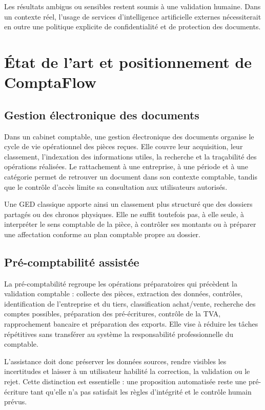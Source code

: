 \documentclass[12pt,a4paper,oneside]{report}
\begin{document}
Les résultats ambigus ou sensibles restent soumis à une validation humaine.
Dans un contexte réel, l'usage de services d'intelligence artificielle externes
nécessiterait en outre une politique explicite de confidentialité et de
protection des documents.

\chapter{État de l'art et positionnement de ComptaFlow}

\section{Gestion électronique des documents}

Dans un cabinet comptable, une gestion électronique des documents organise le
cycle de vie opérationnel des pièces reçues. Elle couvre leur acquisition, leur
classement, l'indexation des informations utiles, la recherche et la
traçabilité des opérations réalisées. Le rattachement à une entreprise, à une
période et à une catégorie permet de retrouver un document dans son contexte
comptable, tandis que le contrôle d'accès limite sa consultation aux
utilisateurs autorisés.

Une GED classique apporte ainsi un classement plus structuré que des dossiers
partagés ou des chronos physiques. Elle ne suffit toutefois pas, à elle seule,
à interpréter le sens comptable de la pièce, à contrôler ses montants ou à
préparer une affectation conforme au plan comptable propre au dossier.

\section{Pré-comptabilité assistée}

La pré-comptabilité regroupe les opérations préparatoires qui précèdent la
validation comptable : collecte des pièces, extraction des données, contrôles,
identification de l'entreprise et du tiers, classification achat/vente,
recherche des comptes possibles, préparation des pré-écritures, contrôle de la
TVA, rapprochement bancaire et préparation des exports. Elle vise à réduire les
tâches répétitives sans transférer au système la responsabilité professionnelle
du comptable.

L'assistance doit donc préserver les données sources, rendre visibles les
incertitudes et laisser à un utilisateur habilité la correction, la validation
ou le rejet. Cette distinction est essentielle : une proposition automatisée
reste une pré-écriture tant qu'elle n'a pas satisfait les règles d'intégrité et
le contrôle humain prévus.
\end{document}
